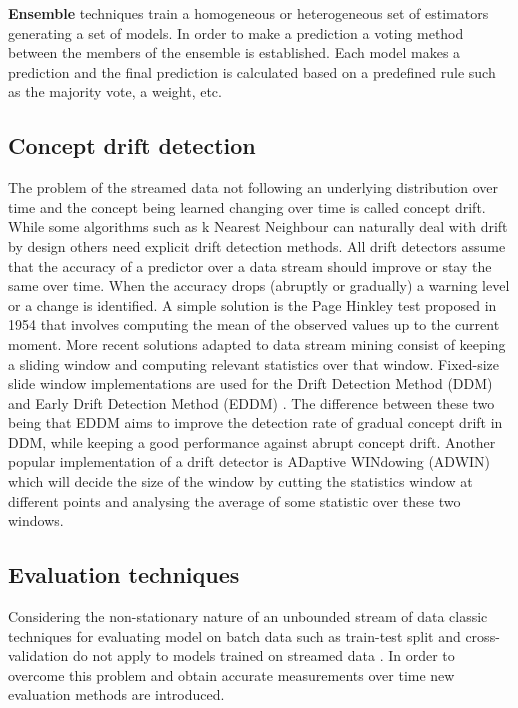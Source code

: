 \documentclass{sig-alternate-br}
\begin{document}
\textbf{Ensemble} techniques train a homogeneous \cite{bifet2012ensembles} or heterogeneous \cite{van2018online} set of estimators generating a set of models. In order to make a prediction a voting method between the members of the ensemble is established. Each model makes a prediction and the final prediction is calculated based on a predefined rule such as the majority vote, a weight, etc.

\subsection{Concept drift detection}

The problem of the streamed data not following an underlying distribution over time and the concept being learned changing over time is called concept drift. While some algorithms such as k Nearest Neighbour can naturally deal with drift by design \cite{van2016massively} others need explicit drift detection methods. All drift detectors assume that the accuracy of a predictor over a data stream should improve or stay the same over time. When the accuracy drops (abruptly or gradually) a warning level or a change is identified. A simple solution is the Page Hinkley test proposed in 1954 \cite{page1954continuous} that involves computing the  mean of the observed values up to the current moment. More recent solutions adapted to data stream mining consist of keeping a sliding window and computing relevant statistics over that window. Fixed-size slide window implementations are used for the Drift Detection Method (DDM) \cite{gama2004learning} and Early Drift Detection Method (EDDM) \cite{baena2006early}. The difference between these two being that EDDM aims to improve the detection rate of gradual concept drift in DDM, while keeping a good performance against abrupt concept drift. Another popular implementation of a drift detector is ADaptive WINdowing (ADWIN) \cite{bifet2007learning} which will decide the size of the window by cutting the statistics window at different points and analysing the average of some statistic over these two windows.

\subsection{Evaluation techniques}

Considering the non-stationary nature of an unbounded stream of data classic techniques for evaluating model on batch data such as train-test split and cross-validation do not apply to models trained on streamed data \cite{gama2009issues}. In order to overcome this problem and obtain accurate measurements over time new evaluation methods are introduced. 
\end{document}
